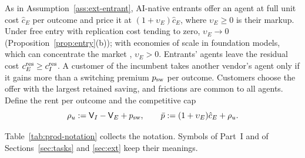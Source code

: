 \begin{assumption}\label{ass:prod-entry}
As in Assumption~\ref{ass:ext-entrant}, AI-native entrants offer an agent at full unit cost $\hat c_E$ per outcome and price it at $(1+\upsilon_E)\hat c_E$, where $\upsilon_E\ge 0$ is their markup. Under free entry with replication cost tending to zero, $\upsilon_E\to 0$ (Proposition~\ref{prop:entry}(b)); with economies of scale in foundation models, which can concentrate the market \citep{korinek2025concentrating}, $\upsilon_E>0$. Entrants' agents leave the residual cost $c^{\rm res}_E\ge c^{\rm res}_I$. A customer of the incumbent takes another vendor's agent only if it gains more than a switching premium $p_{\rm sw}$ per outcome. Customers choose the offer with the largest retained saving, and frictions are common to all agents. Define the rent per outcome and the competitive cap
\begin{equation}\label{eq:prod-cap}
\rho_u:=\mathsf V_I-\mathsf V_E+p_{\rm sw},\qquad \bar p:=(1+\upsilon_E)\hat c_E+\rho_u .
\end{equation}
\end{assumption}

Table~\ref{tab:prod-notation} collects the notation. Symbols of Part~I and of Sections~\ref{sec:tasks} and \ref{sec:ext} keep their meanings.

